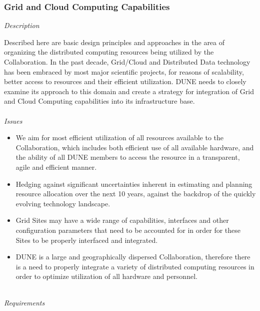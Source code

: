 \subsubsection{Grid and Cloud Computing Capabilities}
\noindent
\textit{Description}

\noindent
Described here are basic design principles and approaches in the area of organizing the distributed computing resources being
utilized by the Collaboration. In the past decade, Grid/Cloud and Distributed
Data technology has been embraced by most major scientific projects, for reasons of scalability,
better access to resources and their efficient utilization. DUNE needs to closely examine its
approach to this domain and create  a strategy for integration of Grid and Cloud Computing capabilities
into its infrastructure base.
\ 
\\
\ 
\\
\textit{Issues}
\begin{itemize}
	\item We aim for most efficient utilization of all resources available to the Collaboration, which includes both efficient use of all 
	available hardware, and the ability of all DUNE members to access the resource in a transparent, agile and efficient manner.
	
	\item Hedging against significant uncertainties inherent in estimating and planning resource allocation over the next 
	10 years, against the backdrop of the quickly evolving technology landscape.
	
	\item Grid Sites may have a wide range of capabilities, interfaces and other configuration parameters that need to be accounted for in order for these Sites to be properly interfaced and integrated.
	
	\item DUNE is a large and geographically dispersed Collaboration, therefore there is a need to properly integrate a variety of distributed 
	computing resources in order to optimize utilization of all hardware and personnel.
\end{itemize}
\ 
\\
\textit{Requirements}
